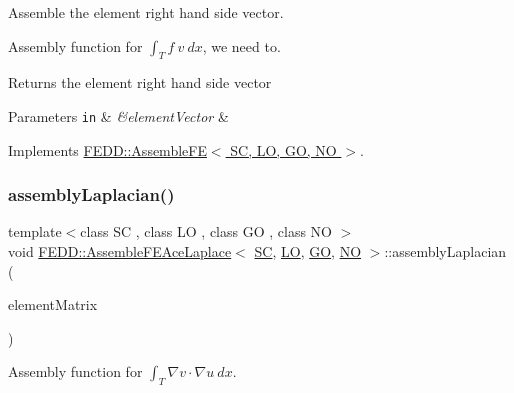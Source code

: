 Assemble the element right hand side vector. 

Assembly function for $ \int_T f ~ v ~dx $, we need to.

\begin{DoxyReturn}{Returns}
the element right hand side vector
\end{DoxyReturn}

\begin{DoxyParams}[1]{Parameters}
\mbox{\tt in}  & {\em \&element\+Vector} & \\
\hline
\end{DoxyParams}


Implements \hyperlink{classFEDD_1_1AssembleFE_a43f18446faadb45bb4e2eae4f82ba9ba}{F\+E\+D\+D\+::\+Assemble\+F\+E$<$ S\+C, L\+O, G\+O, N\+O $>$}.

\mbox{\label{classFEDD_1_1AssembleFEAceLaplace_a0899c869aa01d6a2730b2d5c6d70af22}} 
\subsubsection{\texorpdfstring{assembly\+Laplacian()}{assemblyLaplacian()}}
{\footnotesize\ttfamily template$<$class SC , class LO , class GO , class NO $>$ \\
void \hyperlink{classFEDD_1_1AssembleFEAceLaplace}{F\+E\+D\+D\+::\+Assemble\+F\+E\+Ace\+Laplace}$<$ \hyperlink{fe__test__laplace_8cpp_a79c7e86a57edbb2a5a53242bcd04e41e}{SC}, \hyperlink{fe__test__laplace_8cpp_ad6a38c9f07d3fd633eefca5bccad8410}{LO}, \hyperlink{fe__test__laplace_8cpp_afa2946b509009b4f45eb04bd8c5b27d9}{GO}, \hyperlink{fe__test__laplace_8cpp_a5e24f37b28787429872b6ecb1d0417ce}{NO} $>$\+::assembly\+Laplacian (\begin{DoxyParamCaption}\item[{\hyperlink{classFEDD_1_1AssembleFE_afb5fb5dca3aab59f697a25884e99e894}{Small\+Matrix\+Ptr\+\_\+\+Type} \&}]{element\+Matrix }\end{DoxyParamCaption})\hspace{0.3cm}{\ttfamily [private]}}



Assembly function for $ \int_T \nabla v \cdot \nabla u ~dx$. 

